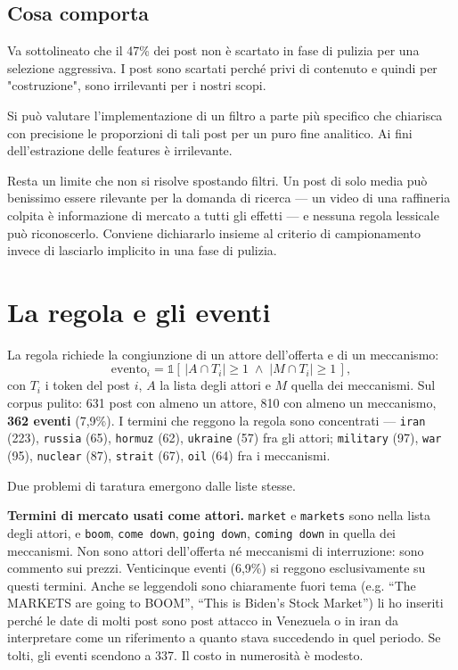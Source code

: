 \documentclass[11pt,a4paper]{article}
\begin{document}
\subsection*{Cosa comporta}
Va sottolineato che il 47\% dei post non è scartato in fase di pulizia per una 
selezione aggressiva.
I post sono scartati perché privi di contenuto e quindi per "costruzione", 
sono irrilevanti per i nostri scopi.

Si può valutare l'implementazione di un filtro a parte più specifico che chiarisca
con precisione le proporzioni di tali post per un puro fine analitico. Ai fini 
dell'estrazione delle features è irrilevante.

Resta un limite che non si risolve spostando filtri. Un post di solo media può
benissimo essere rilevante per la domanda di ricerca — un video di una
raffineria colpita è informazione di mercato a tutti gli effetti — e nessuna
regola lessicale può riconoscerlo. Conviene dichiararlo insieme al criterio di
campionamento invece di lasciarlo implicito in una fase di pulizia.

\section{La regola e gli eventi}

La regola richiede la congiunzione di un attore dell'offerta e di un
meccanismo:
\[
  \text{evento}_i = \mathbb{1}\!\left[\,
    |A \cap T_i| \ge 1 \;\wedge\; |M \cap T_i| \ge 1 \,\right],
\]
con $T_i$ i token del post $i$, $A$ la lista degli attori e $M$ quella dei
meccanismi. Sul corpus pulito: 631 post con almeno un attore, 810 con almeno
un meccanismo, \textbf{362 eventi} (7,9\%).  I termini che
reggono la regola sono concentrati — \texttt{iran} (223), \texttt{russia}
(65), \texttt{hormuz} (62), \texttt{ukraine} (57) fra gli attori;
\texttt{military} (97), \texttt{war} (95), \texttt{nuclear} (87),
\texttt{strait} (67), \texttt{oil} (64) fra i meccanismi.

Due problemi di taratura emergono dalle liste stesse.

\textbf{Termini di mercato usati come attori.} \texttt{market} e
\texttt{markets} sono nella lista degli attori, e \texttt{boom},
\texttt{come down}, \texttt{going down}, \texttt{coming down} in quella dei
meccanismi. Non sono attori dell'offerta né meccanismi di interruzione: sono
commento sui prezzi. Venticinque eventi (6,9\%) si reggono esclusivamente su
questi termini.
Anche se leggendoli sono chiaramente fuori tema (e.g. ``The MARKETS are
going to BOOM'', ``This is Biden's Stock Market'') li ho inseriti perché le 
date di molti post sono post attacco in Venezuela o in iran da interpretare 
come un riferimento a quanto stava succedendo in quel periodo. 
Se tolti, gli eventi scendono a 337. Il costo in numerosità è modesto.
\end{document}
